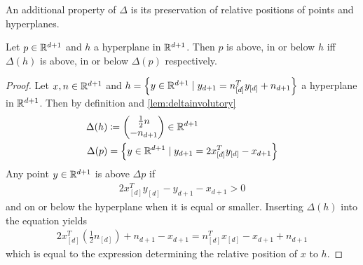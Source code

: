 An additional property of $\Delta$ is its preservation of relative positions of points and hyperplanes.
\begin{lemma}
    \label{lem:relativepositions}
    Let $p \in \mathbb{R}^{d+1}$ and $h$ a hyperplane in $\mathbb{R}^{d+1}$.
    Then $p$ is above, in or below $h$ iff $\Delta(h)$ is above, in or below $\Delta(p)$ respectively.
\end{lemma}
\begin{proof}
    Let $x,n \in \mathbb{R}^{d+1}$ and $h = \left\{ y \in \mathbb{R}^{d+1} \mid y_{d+1} = n_{[d]}^Ty_{[d]} + n_{d+1} \right\}$ a hyperplane in $\mathbb{R}^{d+1}$.
    Then by definition and \cref{lem:deltainvolutory}
    \begin{align}
        \Delta(h) &\coloneqq \begin{pmatrix} \frac{1}{2} n \\ -n_{d+1} \end{pmatrix}  \in \mathbb{R}^{d+1}\\
        \Delta(p) &= \left\{ y \in \mathbb{R}^{d+1} \mid y_{d+1} = 2x_{[d]}^Ty_{[d]} - x_{d+1} \right\}
    \end{align}
    Any point $y \in \mathbb{R}^{d+1}$ is above $\Delta{p}$ if
    \begin{align}
        2x_{[d]}^Ty_{[d]} - y_{d+1} - x_{d+1} > 0
    \end{align}
    and on or below the hyperplane when it is equal or smaller.
    Inserting $\Delta(h)$ into the equation yields
    \begin{align}
        2x_{[d]}^T \left( \frac{1}{2}n_{[d]} \right) + n_{d+1} - x_{d+1} = n_{[d]}^Tx_{[d]} - x_{d+1} + n_{d+1}
    \end{align}
    which is equal to the expression determining the relative position of $x$ to $h$.
\end{proof}

